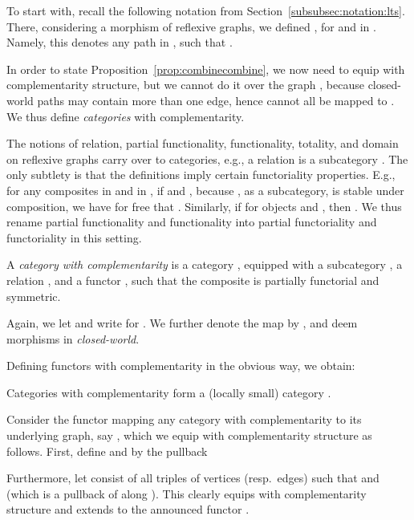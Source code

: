 \documentclass{LMCS}
\theoremstyle{plain}\newtheorem{satz}[thm]{Satz}
\begin{document}
To start with, recall the following notation from
Section~\ref{subsubsec:notation:lts}. There, considering a morphism  of reflexive graphs, we defined ,
for  and  in
.  Namely, this denotes any path  in , such that .

In order to state Proposition~\ref{prop:combinecombine}, we now need
to equip  with complementarity structure, but we cannot
do it over the graph , because closed-world paths may contain
more than one  edge, hence cannot all be mapped to .  We
thus define \emph{categories} with complementarity.

The notions of relation, partial functionality, functionality,
totality, and domain on reflexive graphs carry over to categories,
e.g., a relation  is a subcategory . The only subtlety is that the definitions imply certain
functoriality properties.  E.g., for any composites  in 
and  in , if  and ,
because , as a subcategory, is stable under composition, we have
for free that .  Similarly, if  for objects  and , then .  We thus rename partial functionality and functionality into
partial functoriality and functoriality in this setting.
\begin{defi}
  A \emph{category with complementarity} is a category , equipped
  with a subcategory , a relation , and a functor , such
  that the composite  is
  partially functorial and symmetric.
\end{defi}
Again, we let  and write  for
. We further denote the map  by , and deem
morphisms in  \emph{closed-world}.

Defining functors with complementarity in the obvious way, we obtain:
\begin{prop}
  Categories with complementarity form a (locally small) category
  .
\end{prop}

Consider the functor 
mapping any category with complementarity  to its underlying graph, say , which we equip
with complementarity structure as follows. First, define
 and  by the pullback
\begin{center}
\end{center}
Furthermore, let  consist of all triples  of
vertices (resp.\ edges) such that  and
 (which is a pullback of  along ).  This
clearly equips  with complementarity structure and extends to the
announced functor .
\end{document}
